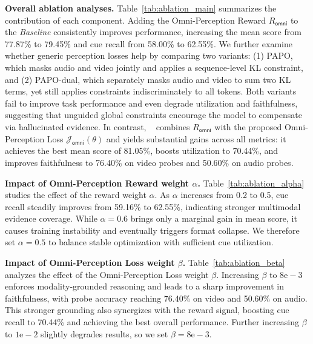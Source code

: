 \documentclass{article}
\theoremstyle{plain}
\theoremstyle{definition}
\theoremstyle{remark}
\begin{document}
\noindent\textbf{Overall ablation analyses.}
Table~\ref{tab:ablation_main} summarizes the contribution of each component.
Adding the Omni-Perception Reward $R_\mathsf{omni}$ to the \textit{Baseline} consistently improves performance, increasing the mean score from 77.87\% to 79.45\% and cue recall from 58.00\% to 62.55\%.
We further examine whether generic perception losses help by comparing two variants: (1) PAPO, which masks audio and video jointly and applies a sequence-level KL constraint, and (2) PAPO-dual, which separately masks audio and video to sum two KL terms, yet still applies constraints indiscriminately to all tokens.
Both variants fail to improve task performance and even degrade utilization and faithfulness, suggesting that unguided global constraints encourage the model to compensate via hallucinated evidence.
In contrast, \ourmethod~ combines $R_\mathsf{omni}$ with the proposed Omni-Perception Loss $\mathcal{J}_\mathsf{omni}(\theta)$ and yields substantial gains across all metrics: it achieves the best mean score of 81.05\%, boosts utilization to 70.44\%, and improves faithfulness to 76.40\% on video probes and 50.60\% on audio probes.



\noindent\textbf{Impact of Omni-Perception Reward weight $\alpha$.}
Table~\ref{tab:ablation_alpha} studies the effect of the reward weight $\alpha$. As $\alpha$ increases from 0.2 to 0.5, cue recall steadily improves from 59.16\% to 62.55\%, indicating stronger multimodal evidence coverage. While $\alpha=0.6$ brings only a marginal gain in mean score, it causes training instability and eventually triggers format collapse. We therefore set $\alpha=0.5$ to balance stable optimization with sufficient cue utilization.



\noindent\textbf{Impact of Omni-Perception Loss weight $\beta$.}
Table~\ref{tab:ablation_beta} analyzes the effect of the Omni-Perception Loss weight $\beta$. Increasing $\beta$ to $8\mathrm{e}{-}3$ enforces modality-grounded reasoning and leads to a sharp improvement in faithfulness, with probe accuracy reaching 76.40\% on video and 50.60\% on audio. This stronger grounding also synergizes with the reward signal, boosting cue recall to 70.44\% and achieving the best overall performance. Further increasing $\beta$ to $1\mathrm{e}{-}2$ slightly degrades results, so we set $\beta=8\mathrm{e}{-}3$.
\end{document}
